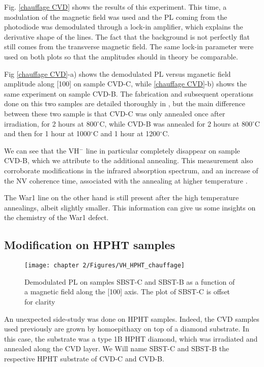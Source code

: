 \documentclass[a4paper,11pt]{report}
\begin{document}
\begin{refsection}
Fig. \ref{chauffage CVD} shows the results of this experiment. This time, a modulation of the magnetic field was used and the PL coming from the photodiode was demodulated through a lock-in amplifier, which explains the derivative shape of the lines. The fact that the background is not perfectly flat still comes from the transverse magnetic field. The same lock-in parameter were used on both plots so that the amplitudes should in theory be comparable.

Fig \ref{chauffage CVD}-a) shows the demodulated PL versus mganetic field amplitude along [100] on sample CVD-C, while \ref{chauffage CVD}-b) shows the same experiment on sample CVD-B. The fabrication and subsequent operations done on this two samples are detailed thoroughly in \citep{ngambou2022improving}, but the main difference between these two sample is that CVD-C was only annealed once after irradiation, for 2 hours at 800$^\circ$C, while CVD-B was annealed for 2 hours at 800$^\circ$C and then for 1 hour at 1000$^\circ$C and 1 hour at 1200$^\circ$C.

We can see that the VH$^-$ line in particular completely disappear on sample CVD-B, which we attribute to the additional annealing. This measurement also corroborate modifications in the infrared absorption spectrum, and an increase of the NV coherence time, associated with the annealing at higher temperature \citep{ngambou2022improving}.

The War1 line on the other hand is still present after the high temperature annealings, albeit slightly smaller. This information can give us some insights on the chemistry of the War1 defect. %

\subsection{Modification on HPHT samples}

\begin{figure}[h]
\centering
\texttt{[image: chapter 2/Figures/VH\_HPHT\_chauffage]}
\caption{Demodulated PL on samples SBST-C and SBST-B as a function of a magnetic field along the [100] axis. The plot of SBST-C is offset for clarity}
\label{chauffage HPHT}
\end{figure}

An unexpected side-study was done on HPHT samples. Indeed, the CVD samples used previously are grown by homoepithaxy on top of a diamond substrate. In this case, the substrate was a type 1B HPHT diamond, which was irradiated and annealed along the CVD layer. We Will name SBST-C and SBST-B the respective HPHT substrate of CVD-C and CVD-B.


\end{refsection}
\end{document}
